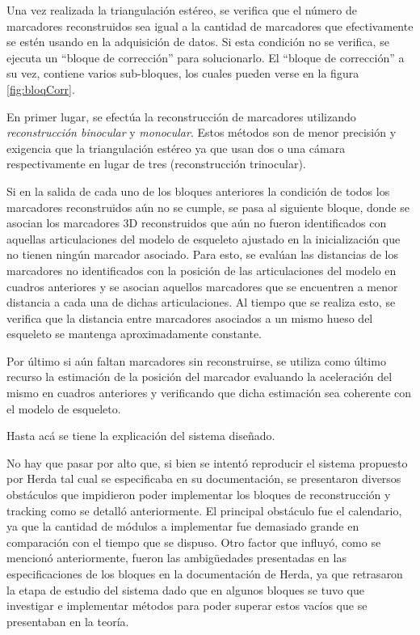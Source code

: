 Una vez realizada la triangulación estéreo, se verifica que el número de marcadores reconstruidos sea igual a la cantidad de marcadores que efectivamente se estén usando en la adquisición de datos. Si esta condición no se verifica, se ejecuta un “bloque de corrección” para solucionarlo. El “bloque de corrección” a su vez, contiene  varios sub-bloques, los cuales pueden verse en la figura \ref{fig:bloqCorr}.

En primer lugar, se efectúa la reconstrucción de marcadores utilizando \emph{reconstrucción binocular} y \emph{monocular}. Estos métodos son de menor precisión y exigencia que la triangulación estéreo ya que usan dos o una cámara respectivamente en lugar de tres (reconstrucción trinocular).

 Si en la salida de cada uno de los bloques anteriores la condición de todos los marcadores reconstruidos aún no se cumple, se pasa al siguiente bloque, donde se asocian los marcadores 3D reconstruidos que aún no fueron identificados con aquellas articulaciones del modelo de esqueleto ajustado en la inicialización que no tienen ningún marcador asociado. Para esto, se evalúan las distancias de los marcadores no identificados con la posición de las articulaciones del modelo en cuadros anteriores y se asocian aquellos marcadores que se encuentren a menor distancia a cada una de dichas articulaciones. Al tiempo que se realiza esto, se verifica que la distancia entre marcadores asociados a un mismo hueso del esqueleto se mantenga aproximadamente constante.
 
Por último si aún faltan marcadores sin reconstruirse, se utiliza como último recurso la estimación de la posición del marcador evaluando la aceleración del mismo en cuadros anteriores y verificando que dicha estimación sea coherente con el modelo de esqueleto.


Hasta acá se tiene la explicación del sistema diseñado. 

No hay que pasar por alto que, si bien se intentó reproducir el sistema propuesto por Herda\cite{herda} tal cual se especificaba en su documentación, se presentaron diversos obstáculos que impidieron poder implementar los bloques de reconstrucción y tracking como se detalló anteriormente. El principal obstáculo fue el calendario, ya que la cantidad de módulos a implementar fue demasiado grande en comparación con el tiempo que se dispuso. Otro factor que influyó, como se mencionó anteriormente, fueron las ambigüedades presentadas en las especificaciones de los bloques en la documentación de Herda\cite{herda}, ya que retrasaron la etapa de estudio del sistema dado que en algunos bloques se tuvo que investigar e implementar métodos para poder superar estos vacíos que se presentaban en la teoría.

